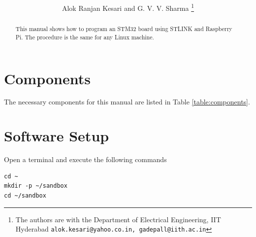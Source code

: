 \documentclass[journal,12pt,twocolumn]{IEEEtran}
\begin{document}

\def\putbox#1#2#3{\makebox[0in][l]{\makebox[#1][l]{}\raisebox{\baselineskip}[0in][0in]{\raisebox{#2}[0in][0in]{#3}}}}
     \def\rightbox#1{\makebox[0in][r]{#1}}
     \def\centbox#1{\makebox[0in]{#1}}
     \def\topbox#1{\raisebox{-\baselineskip}[0in][0in]{#1}}
     \def\midbox#1{\raisebox{-0.5\baselineskip}[0in][0in]{#1}}

\vspace{3cm}

\title{
}%
\author{Alok Ranjan Kesari and G. V. V. Sharma%
\thanks{ The authors are with the Department of Electrical Engineering, IIT Hyderabad
        {\tt\small alok.kesari@yahoo.co.in, gadepall@iith.ac.in}}%

}



\maketitle


\tableofcontents


\begin{abstract}
This manual shows how to program an STM32 board using STLINK and Raspberry Pi. The procedure is the same for any Linux machine.
\end{abstract}
\section{Components}
The necessary components for this manual are listed in Table \ref{table:components}.
\begin{table}[!h]
\centering

\caption{}
\label{table:components}
\end{table}
%
\section{Software Setup}
Open a terminal and execute the following commands
\begin{lstlisting}
cd ~
mkdir -p ~/sandbox
cd ~/sandbox
\end{lstlisting}
\end{document}
